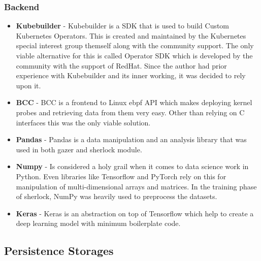 \subsubsection{Backend}
\begin{itemize}[noitemsep,nolistsep] 
    \item \textbf{Kubebuilder} - Kubebuilder is a SDK that is used to build Custom Kubernetes Operators. This is created and maintained by the Kubernetes special interest group themself along with the community support. The only viable alternative for this is called Operator SDK which is developed by the community with the support of RedHat. Since the author had prior experience with Kubebuilder and its inner working, it was decided to rely upon it.
    \item \textbf{BCC} - BCC is a frontend to Linux \ac{ebpf} API which makes deploying kernel probes and retrieving data from them very easy. Other than relying on C interfaces this was the only viable solution. 
    \item \textbf{Pandas} - Pandas is a data manipulation and an analysis library that was used in both \ac{gazer} and \ac{sherlock} module.
    \item \textbf{Numpy} - Is considered a holy grail when it comes to data science work in Python. Even libraries like Tensorflow and PyTorch rely on this for manipulation of multi-dimensional arrays and matrices. In the training phase of \ac{sherlock}, NumPy was heavily used to preprocess the datasets.
    \item \textbf{Keras} - Keras is an abstraction on top of Tensorflow which help to create a deep learning model with minimum boilerplate code.
    
\end{itemize}

\subsection{Persistence Storages}

